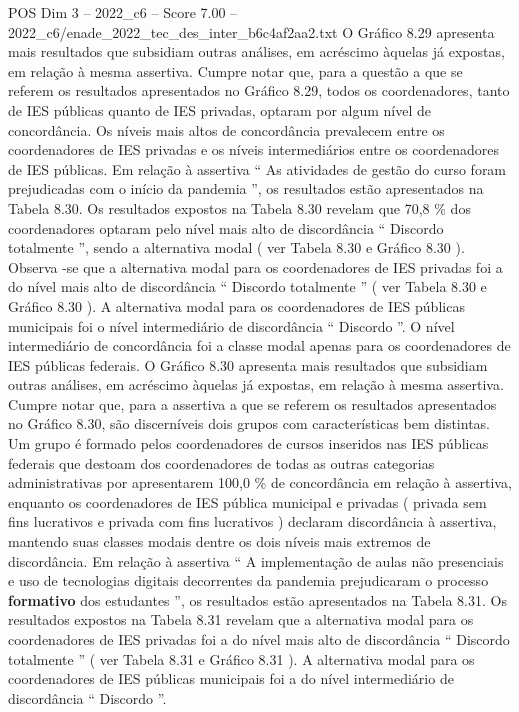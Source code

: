 \begin{textsample}{POS Dim 3 – 2022\_c6 – Score 7.00 – 2022\_c6/enade\_2022\_tec\_des\_inter\_b6c4af2aa2.txt}
O Gráfico 8.29 apresenta mais resultados que subsidiam outras análises, em acréscimo àquelas já expostas, em relação à mesma assertiva.
Cumpre notar que, para a questão a que se referem os resultados apresentados no Gráfico 8.29, todos os coordenadores, tanto de IES públicas quanto de IES privadas, optaram por algum nível de concordância.
Os níveis mais altos de concordância prevalecem entre os coordenadores de IES privadas e os níveis intermediários entre os coordenadores de IES públicas.
Em relação à assertiva “ As atividades de gestão do curso foram prejudicadas com o início da pandemia ”, os resultados estão apresentados na Tabela 8.30.
Os resultados expostos na Tabela 8.30 revelam que 70,8 \% dos coordenadores optaram pelo nível mais alto de discordância “ Discordo totalmente ”, sendo a alternativa modal ( ver Tabela 8.30 e Gráfico 8.30 ).
Observa -se que a alternativa modal para os coordenadores de IES privadas foi a do nível mais alto de discordância “ Discordo totalmente ” ( ver Tabela 8.30 e Gráfico 8.30 ).
A alternativa modal para os coordenadores de IES públicas municipais foi o nível intermediário de discordância “ Discordo ”.
O nível intermediário de concordância foi a classe modal apenas para os coordenadores de IES públicas federais.
O Gráfico 8.30 apresenta mais resultados que subsidiam outras análises, em acréscimo àquelas já expostas, em relação à mesma assertiva.
Cumpre notar que, para a assertiva a que se referem os resultados apresentados no Gráfico 8.30, são discerníveis dois grupos com características bem distintas.
Um grupo é formado pelos coordenadores de cursos inseridos nas IES públicas federais que destoam dos coordenadores de todas as outras categorias administrativas por apresentarem 100,0 \% de concordância em relação à assertiva, enquanto os coordenadores de IES pública municipal e privadas ( privada sem fins lucrativos e privada com fins lucrativos ) declaram discordância à assertiva, mantendo suas classes modais dentre os dois níveis mais extremos de discordância.
Em relação à assertiva “ A implementação de aulas não presenciais e uso de tecnologias digitais decorrentes da pandemia prejudicaram o processo \textbf{formativo} dos estudantes ”, os resultados estão apresentados na Tabela 8.31.
Os resultados expostos na Tabela 8.31 revelam que a alternativa modal para os coordenadores de IES privadas foi a do nível mais alto de discordância “ Discordo totalmente ” ( ver Tabela 8.31 e Gráfico 8.31 ).
A alternativa modal para os coordenadores de IES públicas municipais foi a do nível intermediário de discordância “ Discordo ”.

\end{textsample}
